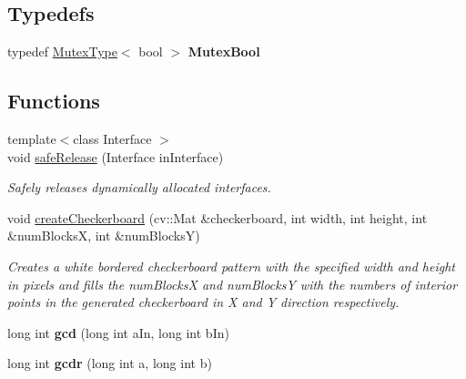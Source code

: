 \subsection*{Typedefs}
\begin{DoxyCompactItemize}
\item 
\hypertarget{namespacepersonal_robotics_a1ef569ada10ae2d7dbbb214211e23e37}{}typedef \hyperlink{classpersonal_robotics_1_1_mutex_type}{Mutex\+Type}$<$ bool $>$ {\bfseries Mutex\+Bool}\label{namespacepersonal_robotics_a1ef569ada10ae2d7dbbb214211e23e37}

\end{DoxyCompactItemize}
\subsection*{Functions}
\begin{DoxyCompactItemize}
\item 
{\footnotesize template$<$class Interface $>$ }\\void \hyperlink{namespacepersonal_robotics_a10bc590dad378d8a84fd97546b331d62}{safe\+Release} (Interface in\+Interface)
\begin{DoxyCompactList}\small\item\em Safely releases dynamically allocated interfaces. \end{DoxyCompactList}\item 
\hypertarget{namespacepersonal_robotics_a2c3daa4285088463c734b34b33465a60}{}void \hyperlink{namespacepersonal_robotics_a2c3daa4285088463c734b34b33465a60}{create\+Checkerboard} (cv\+::\+Mat \&checkerboard, int width, int height, int \&num\+Blocks\+X, int \&num\+Blocks\+Y)\label{namespacepersonal_robotics_a2c3daa4285088463c734b34b33465a60}

\begin{DoxyCompactList}\small\item\em Creates a white bordered checkerboard pattern with the specified width and height in pixels and fills the num\+Blocks\+X and num\+Blocks\+Y with the numbers of interior points in the generated checkerboard in X and Y direction respectively. \end{DoxyCompactList}\item 
\hypertarget{namespacepersonal_robotics_a22e343fb26c5ce54021c2af44388a75b}{}long int {\bfseries gcd} (long int a\+In, long int b\+In)\label{namespacepersonal_robotics_a22e343fb26c5ce54021c2af44388a75b}

\item 
\hypertarget{namespacepersonal_robotics_abdd1f29ea0e1761e9a426fed113d0eaa}{}long int {\bfseries gcdr} (long int a, long int b)\label{namespacepersonal_robotics_abdd1f29ea0e1761e9a426fed113d0eaa}


\end{DoxyCompactItemize}
